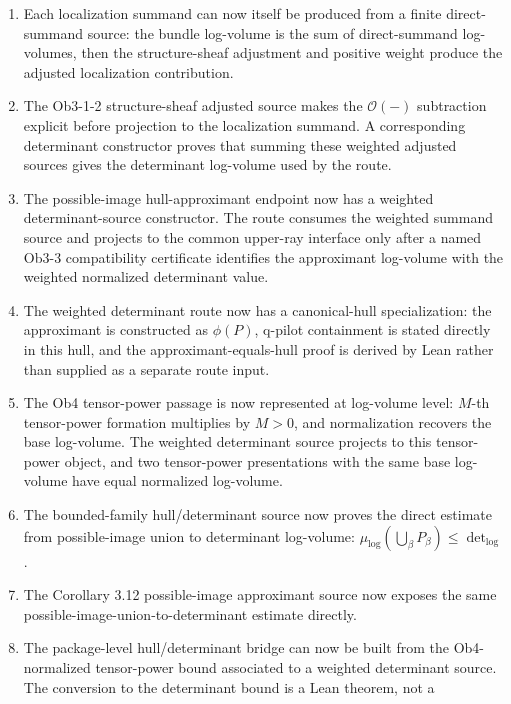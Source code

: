 \documentclass[11pt]{article}
\newcommand{\Lean}{Lean}
\theoremstyle{plain}
\theoremstyle{definition}
\theoremstyle{remark}
\begin{document}
\begin{enumerate}
  localization source: adjusted vector-bundle summand log-volumes are summed,
  the positive tensor-power value is derived, and normalization is proved to
  return the determinant log-volume before projecting to the determinant
  interface.
\item Each localization summand can now itself be produced from a finite
  direct-summand source: the bundle log-volume is the sum of direct-summand
  log-volumes, then the structure-sheaf adjustment and positive weight produce
  the adjusted localization contribution.
\item The Ob3-1-2 structure-sheaf adjusted source makes the
  \(\mathcal O(-)\) subtraction explicit before projection to the localization
  summand.  A corresponding determinant constructor proves that summing these
  weighted adjusted sources gives the determinant log-volume used by the
  route.
\item The possible-image hull-approximant endpoint now has a weighted
  determinant-source constructor.  The route consumes the weighted summand
  source and projects to the common upper-ray interface only after a named
  Ob3-3 compatibility certificate identifies the approximant log-volume with
  the weighted normalized determinant value.
\item The weighted determinant route now has a canonical-hull specialization:
  the approximant is constructed as \(\phi(P)\), q-pilot containment is stated
  directly in this hull, and the approximant-equals-hull proof is derived by
  \Lean{} rather than supplied as a separate route input.
\item The Ob4 tensor-power passage is now represented at log-volume level:
  \(M\)-th tensor-power formation multiplies by \(M>0\), and normalization
  recovers the base log-volume.  The weighted determinant source projects to
  this tensor-power object, and two tensor-power presentations with the same
  base log-volume have equal normalized log-volume.
\item The bounded-family hull/determinant source now proves the direct
  estimate from possible-image union to determinant log-volume:
  \(\mu_{\log}(\bigcup_\beta P_\beta)\le\det_{\log}\).
\item The Corollary 3.12 possible-image approximant source now exposes the
  same possible-image-union-to-determinant estimate directly.
\item The package-level hull/determinant bridge can now be built from the
  Ob4-normalized tensor-power bound associated to a weighted determinant
  source.  The conversion to the determinant bound is a Lean theorem, not a

\end{enumerate}
\end{document}
